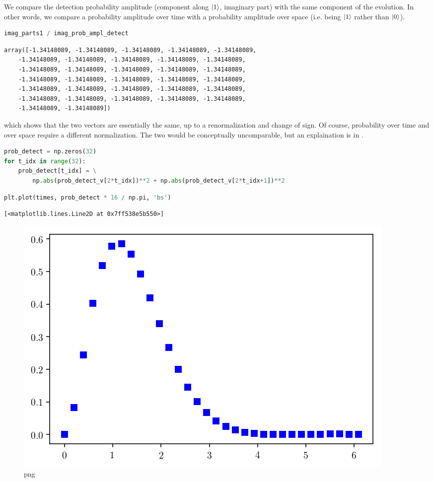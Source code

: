 We compare the detection probability amplitude (component along $\ket{1}$, imaginary part)
with the same component of the evolution.
In other words, we compare a probability amplitude over time with
a probability amplitude over space (i.e. being $\ket{1}$ rather than $\ket{0}$).

\begin{lstlisting}[language=Python]
imag_parts1 / imag_prob_ampl_detect
\end{lstlisting}
\begin{lstlisting}[basicstyle=\tiny\ttfamily]
array([-1.34148089, -1.34148089, -1.34148089, -1.34148089, -1.34148089,
    -1.34148089, -1.34148089, -1.34148089, -1.34148089, -1.34148089,
    -1.34148089, -1.34148089, -1.34148089, -1.34148089, -1.34148089,
    -1.34148089, -1.34148089, -1.34148089, -1.34148089, -1.34148089,
    -1.34148089, -1.34148089, -1.34148089, -1.34148089, -1.34148089,
    -1.34148089, -1.34148089, -1.34148089, -1.34148089, -1.34148089,
    -1.34148089, -1.34148089])
\end{lstlisting}
which shows that the two vectors are essentially the same,
up to a renormalization and change of sign.
Of course, probability over time and over space require a different normalization.
The two would be conceptually uncomparable, but an explaination is in \cite[eq. 6]{Maccone:QMOT}.

\begin{lstlisting}[language=Python]
prob_detect = np.zeros(32)
for t_idx in range(32):
    prob_detect[t_idx] = \
        np.abs(prob_detect_v[2*t_idx])**2 + np.abs(prob_detect_v[2*t_idx+1])**2
\end{lstlisting}

\begin{lstlisting}[language=Python]
plt.plot(times, prob_detect * 16 / np.pi, 'bs')
\end{lstlisting}

\begin{lstlisting}
[<matplotlib.lines.Line2D at 0x7ff538e5b550>]
\end{lstlisting}

\begin{figure}
\centering
\includegraphics[width=0.6\linewidth]{output_99_1.png}
\caption[]{png}
\end{figure}

